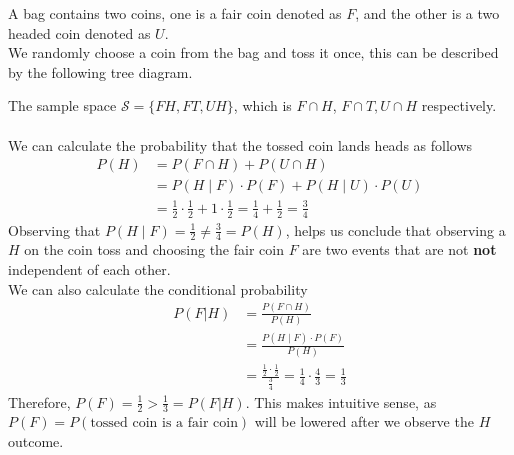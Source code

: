 \begin{ex} %
A bag contains two coins, one is a fair coin denoted as $F$, and the other is a two headed coin denoted as $U$. \\
We randomly choose a coin from the bag and toss it once, this can be described by the following tree diagram.\\
\begin{center}
\end{center}
The sample space $\mathcal{S}=\{FH,FT,UH\}$, which is $F\cap H$, $F\cap T,U\cap H$ respectively.\\
\hfill\\
We can calculate the probability that the tossed coin lands heads as follows \begin{align*}
P(H)&=P(F\cap H)+P(U\cap H)\\
&=P(H\mid F)\cdot P(F)+P(H\mid U)\cdot P(U)\\
&=\frac{1}{2}\cdot \frac{1}{2}+1\cdot \frac{1}{2}=\frac{1}{4}+\frac{1}{2}=\frac{3}{4}
\end{align*}
Observing that $P(H\mid F)=\frac{1}{2}\neq \frac{3}{4}=P(H)$, helps us conclude that observing a $H$ on the coin toss and choosing the fair coin $F$ are two events that are not \textbf{not} independent of each other. 
\\

We can also calculate the conditional probability
\begin{align*}
P(F|H)&=\frac{P(F\cap H)}{P(H)}\\
&=\frac{P(H\mid F)\cdot P(F)}{P(H)}\\
&=\frac{\frac{1}{2}\cdot \frac{1}{2}}{\frac{3}{4}}=\frac{1}{4}\cdot \frac{4}{3}=\frac{1}{3}
\end{align*}
Therefore, $P(F)=\frac{1}{2}>\frac{1}{3}=P(F|H)$. This makes intuitive sense, as $P(F) = P(\text{tossed coin is a fair coin})$ will be lowered after we observe the $H$ outcome.
\end{ex}


